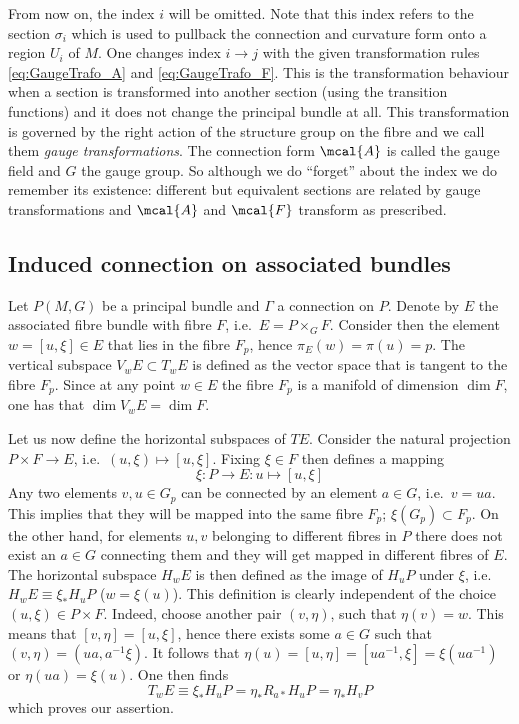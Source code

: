 \documentclass[10pt,reqno]{amsart}
\numberwithin{equation}{section}
\begin{document}
From now on, the index $i$ will be omitted. Note that this index 
refers to the section $\sigma_i$ which is used to pullback the 
connection and curvature form onto a region $U_i$ of $M$. One 
changes index $i \rightarrow j$ with the given transformation 
rules \eqref{eq:GaugeTrafo_A} and \eqref{eq:GaugeTrafo_F}. This 
is the transformation behaviour when a section is transformed 
into another section (using the transition functions) and it does 
not change the principal bundle at all. This transformation is 
governed by the right action of the structure group on the fibre 
and we call them \emph{gauge transformations}. The connection 
form $\mcal{A}$ is called the gauge field and $G$ the gauge 
group. So although we do ``forget'' about the index we do 
remember its existence: different but equivalent sections are 
related by gauge transformations and $\mcal{A}$ and $\mcal{F}$ 
transform as prescribed.

\subsection{Induced connection on associated bundles}

Let $P(M,G)$ be a principal bundle and $\Gamma$ a connection on 
$P$. Denote by $E$ the associated fibre bundle with fibre $F$, 
i.e.\ $E = P \times_G F$. Consider then the element $w = [u,\xi] 
\in E$ that lies in the fibre $F_p$, hence $\pi_E(w) = \pi(u) = 
p$. The vertical subspace $V_wE \subset T_wE$ is defined as the 
vector space that is tangent to the fibre $F_p$. Since at any 
point $w \in E$ the fibre $F_p$ is a manifold of dimension $\dim 
F$, one has that $\dim V_wE = \dim F$.

Let us now define the horizontal subspaces of $TE$. Consider the 
natural projection $P \times F \rightarrow E$, i.e.\ $(u,\xi) 
\mapsto [u,\xi]$. Fixing $\xi \in F$ then defines a mapping
\begin{equation}
	\xi : P \rightarrow E : u \mapsto [u,\xi]
\end{equation}
Any two elements $v,u \in G_p$ can be connected by an element $a 
\in G$, i.e.\ $v = ua$. This implies that they will be mapped 
into the same fibre $F_p$; $\xi(G_p) \subset F_p$. On the other 
hand, for elements $u,v$ belonging to different fibres in $P$ 
there does not exist an $a \in G$ connecting them and they will 
get mapped in different fibres of $E$. The horizontal subspace 
$H_wE$ is then defined as the image of $H_uP$ under $\xi$, i.e.\ 
$H_wE \equiv \xi_\ast H_uP$ ($w=\xi(u)$). This definition is 
clearly independent of the choice $(u,\xi) \in P \times F$.  
Indeed, choose another pair $(v,\eta)$, such that $\eta(v) = w$.  
This means that $[v,\eta] = [u,\xi]$, hence there exists some $a 
\in G$ such that $(v,\eta) = (ua, a^{-1}\xi)$. It follows that 
$\eta(u) = [u,\eta] = [ua^{-1},\xi] = \xi(ua^{-1})$ or $\eta(ua) 
= \xi(u)$. One then finds
%
\begin{displaymath}
	T_wE \equiv \xi_\ast H_uP = \eta_\ast R_{a\ast} H_uP = 
	\eta_\ast H_vP
\end{displaymath}
which proves our assertion.
\end{document}

